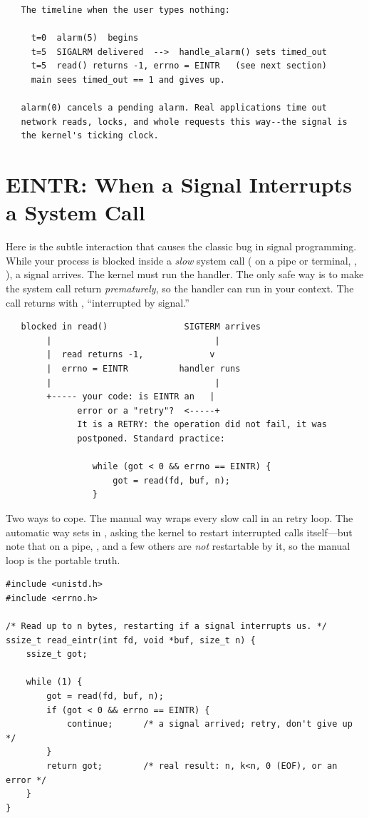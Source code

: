 \begin{verbatim}
   The timeline when the user types nothing:

     t=0  alarm(5)  begins
     t=5  SIGALRM delivered  -->  handle_alarm() sets timed_out
     t=5  read() returns -1, errno = EINTR   (see next section)
     main sees timed_out == 1 and gives up.

   alarm(0) cancels a pending alarm. Real applications time out
   network reads, locks, and whole requests this way--the signal is
   the kernel's ticking clock.
\end{verbatim}

\section{EINTR: When a Signal Interrupts a System Call}

Here is the subtle interaction that causes the classic bug in signal
programming. While your process is blocked inside a \emph{slow}
system call ( on a pipe or terminal, ,
), a signal arrives. The kernel must run the handler. The
only safe way is to make the system call return \emph{prematurely}, so
the handler can run in your context. The call returns  with
, ``interrupted by signal.''

\begin{verbatim}
   blocked in read()               SIGTERM arrives
        |                                |
        |  read returns -1,             v
        |  errno = EINTR          handler runs
        |                                |
        +----- your code: is EINTR an   |
              error or a "retry"?  <-----+
              It is a RETRY: the operation did not fail, it was
              postponed. Standard practice:

                 while (got < 0 && errno == EINTR) {
                     got = read(fd, buf, n);
                 }
\end{verbatim}

Two ways to cope. The manual way wraps every slow call in an
 retry loop. The automatic way sets  in
, asking the kernel to restart interrupted calls
itself---but note that  on a pipe, , and a few
others are \emph{not} restartable by it, so the manual loop is the
portable truth.

\begin{lstlisting}[caption={The universal EINTR retry loop.}]
#include <unistd.h>
#include <errno.h>

/* Read up to n bytes, restarting if a signal interrupts us. */
ssize_t read_eintr(int fd, void *buf, size_t n) {
    ssize_t got;

    while (1) {
        got = read(fd, buf, n);
        if (got < 0 && errno == EINTR) {
            continue;      /* a signal arrived; retry, don't give up */
        }
        return got;        /* real result: n, k<n, 0 (EOF), or an error */
    }
}
\end{lstlisting}

